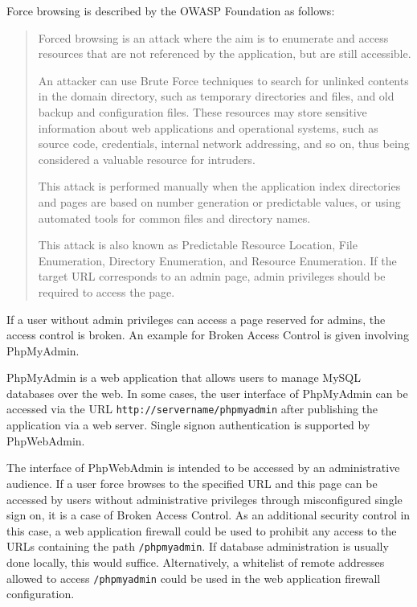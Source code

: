 Force browsing is described by the OWASP Foundation as follows:
\begin{quote}
	Forced browsing is an attack where the aim is to enumerate and access resources that are not referenced by the application, but are still accessible.

	An attacker can use Brute Force techniques to search for unlinked contents in the domain directory, such as temporary directories and files, and old backup and configuration files. These resources may store sensitive information about web applications and operational systems, such as source code, credentials, internal network addressing, and so on, thus being considered a valuable resource for intruders.

	This attack is performed manually when the application index directories and pages are based on number generation or predictable values, or using automated tools for common files and directory names.

	This attack is also known as Predictable Resource Location, File Enumeration, Directory Enumeration, and Resource Enumeration.
	If the target URL corresponds to an admin page, admin privileges should be required to access the page. \cite{OWASP/forcebrowsing}
\end{quote}
If a user without admin privileges can access a page reserved for admins, the access control is broken. An example for Broken Access Control is given involving PhpMyAdmin.

PhpMyAdmin is a web application that allows users to manage MySQL databases over the web.
In some cases, the user interface of PhpMyAdmin can be accessed via the URL \verb|http://servername/phpmyadmin| after publishing the application via a web server. Single signon authentication is supported by PhpWebAdmin. 
\cite{phpmyadmin/overview,phpmyadmin/quickinstall,ubuntu/phpmyadmin,phpmyadmin/signon}

The interface of PhpWebAdmin is intended to be accessed by an administrative audience.
If a user force browses to the specified URL and this page can be accessed by users without administrative privileges through misconfigured single sign on, it is a case of Broken Access Control.
As an additional security control in this case, a web application firewall could be used to prohibit any access to the URLs containing the path \verb|/phpmyadmin|.
If database administration is usually done locally, this would suffice.
Alternatively, a whitelist of remote addresses allowed to access \verb|/phpmyadmin| could be used in the web application firewall configuration.

